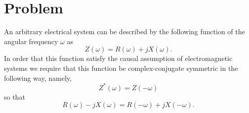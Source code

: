 \documentclass[]{article}
\begin{document}
\section{Problem}
An arbitrary electrical system can be described by the following function of the angular frequency $ \omega $ as 
\[
    Z(\omega) = R(\omega) + j X(\omega) .
\]
In order that this function satisfy the causal assumption of electromagnetic systems we require that this function be complex-conjugate symmetric in the following way, namely,
\[
    Z^*(\omega) = Z(-\omega)
\]
so that 
\[
    R(\omega) - j X(\omega) =  R(-\omega) + j X(-\omega).
\]
\end{document}
